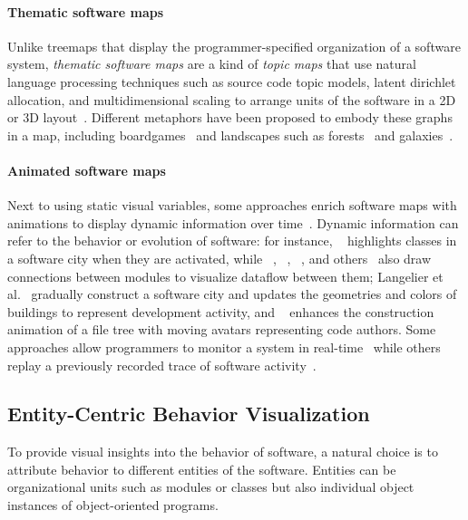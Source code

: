\paragraph{Thematic software maps}

Unlike treemaps that display the pro\-gram\-mer-specified organization of a software system, \emph{thematic software maps} are a kind of \emph{topic maps} that use natural language processing techniques such as source code topic models, latent dirichlet allocation, and multidimensional scaling to arrange units of the software in a 2D or 3D layout~\cite{atzberger2023visualization}.
Different metaphors have been proposed to embody these graphs in a map, including boardgames~\cite{atzberger2022visualization} and landscapes such as forests~\cite{atzberger2021softwareforest} and galaxies~\cite{atzberger2021softwaregalaxies}.

\paragraph{Animated software maps}

Next to using static visual variables, some approaches enrich software maps with animations to display dynamic information over time~\cite[sec. 3.4]{lemieux2006visualization}.
Dynamic information can refer to the behavior or evolution of software:
for instance, ~\cite{dugerdil2008execution} highlights classes in a software city when they are activated, while ~\cite{dashuber2022trace}, ~\cite{krause2021live}, ~\cite{waller2013synchrovis}, and others~\cite{ciolkowski20173d} also draw connections between modules to visualize dataflow between them;
Langelier et al.~\cite{langelier2008exploring} gradually construct a software city and updates the geometries and colors of buildings to represent development activity, and ~\cite{caudwell2010gource} enhances the construction animation of a file tree with moving avatars representing code authors.
Some approaches allow programmers to monitor a system in real-time~\cite{fittkau2013live} while others replay a previously recorded trace of software activity~\cite{dugerdil2008execution}.

\subsection{Entity-Centric Behavior Visualization}

To provide visual insights into the behavior of software, a natural choice is to attribute behavior to different entities of the software.
Entities can be organizational units such as modules or classes but also individual object instances of object-oriented programs.

